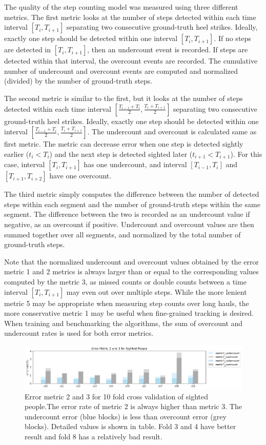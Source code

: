 \documentclass[11pt]{article}
\begin{document}
{The quality of the step counting model was measured using three different metrics. The first metric looks at the number of steps detected within each time interval $[T_i, T_{i+1}]$ separating two consecutive ground-truth heel strikes. Ideally, exactly one step should be detected within one interval $[T_i, T_{i+1}]$. If no steps are detected in $[T_i, T_{i+1}]$, then an undercount event is recorded. If steps are detected within that interval, the overcount events are recorded. The cumulative number of undercount and overcount events are computed and normalized (divided) by the number of ground-truth steps.

The second metric is similar to the first,  but it looks at the number of steps detected within each time interval $[\frac{T_{i-1}+T_i}{2}, \frac{T_i+T_{i+1}}{2}]$ separating two consecutive ground-truth heel strikes. Ideally, exactly one step should be detected within one interval $[\frac{T_{i-1}+T_i}{2}, \frac{T_i+T_{i+1}}{2}]$. The undercount and overcount is calculated same as first metric. The metric can decrease error when one step is detected sightly earlier ($t_i<T_i$) and the next step is detected sighted later ($t_{i+1}<T_{i+1}$). For this case, interval $[T_i, T_{i+1}]$ has one undercount, and interval $[T_{i-1}, T_i]$ and $[T_{i+1}, T_{i+2}]$ have one overcount.

The third metric simply computes the difference between the number of detected steps within each segment and the number of ground-truth steps within the same segment. The difference between the two is recorded as an undercount value if negative, as an overcount if positive. Undercount and overcount values are then summed together over all segments, and normalized by the total number of ground-truth steps.

Note that the normalized undercount and overcount values obtained by the error metric 1 and 2 metrics is always larger than or equal to the corresponding values computed by the metric 3, as missed counts or double counts between a time interval $[T_i, T_{i+1}]$ may even out over multiple steps. While the more lenient metric 5 may be appropriate when measuring step counts over long hauls, the more conservative metric 1 may be useful when fine-grained tracking is desired. When training and benchmarking the algorithms, the sum of overcount and undercount rates is used for both error metrics.

\begin{figure}[ht]
\centering
\includegraphics[scale=0.5]{error_metric_23_na_10fold}
\caption{Error metric 2 and 3 for 10 fold cross validation of sighted people.The error rate of metric 2 is always higher than metric 3. The undercount error (blue blocks) is less than overcount error (grey blocks). Detailed values is shown in table. Fold 3 and 4 have better result and fold 8 has a relatively bad result.}
\label{fig:error_metric_23_na_10fold}
\end{figure}

}
\end{document}
